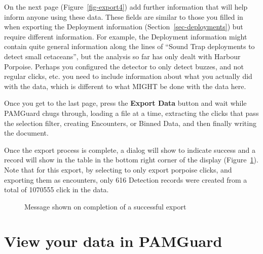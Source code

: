 \documentclass[
]{article}
\begin{document}
On the next page (Figure~\ref{fig-export4}) add further information that
will help inform anyone using these data. These fields are similar to
those you filled in when exporting the Deployment information
(Section~\ref{sec-deployments}) but require different information. For
example, the Deployment information might contain quite general
information along the lines of ``Sound Trap deployments to detect small
cetaceans'', but the analysis so far has only dealt with Harbour
Porpoise. Perhaps you configured the detector to only detect buzzes, and
not regular clicks, etc. you need to include information about what you
actually did with the data, which is different to what MIGHT be done
with the data here.

Once you get to the last page, press the \textbf{Export Data} button and
wait while PAMGuard chugs through, loading a file at a time, extracting
the clicks that pass the selection filter, creating Encounters, or
Binned Data, and then finally writing the document.

Once the export process is complete, a dialog will show to indicate
success and a record will show in the table in the bottom right corner
of the display (Figure~\ref{fig-success}). Note that for this export, by
selecting to only export porpoise clicks, and exporting them as
encounters, only 616 Detection records were created from a total of
1070555 click in the data.

\begin{figure}


\caption{\label{fig-success}Message shown on completion of a successful
export}

\end{figure}%

\section{View your data in PAMGuard}\label{view-your-data-in-pamguard}
\end{document}
